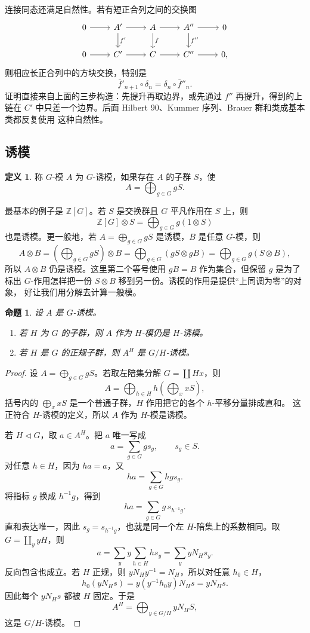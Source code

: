 \documentclass[11pt,a4paper,openany]{ctexbook}
\numberwithin{equation}{chapter}
\newcommand{\Z}{\mathbb{Z}}
\theoremstyle{plain}
\newtheorem{proposition}[theorem]{命题}
\theoremstyle{definition}
\newtheorem{definition}[theorem]{定义}
\theoremstyle{remark}
\begin{document}
连接同态还满足自然性。若有短正合列之间的交换图
\[
\begin{tikzcd}
0 \arrow[r] & A' \arrow[r] \arrow[d,"f'"] & A \arrow[r] \arrow[d,"f"] &
A'' \arrow[r] \arrow[d,"f''"] & 0\\
0 \arrow[r] & C' \arrow[r] & C \arrow[r] & C'' \arrow[r] & 0,
\end{tikzcd}
\]
则相应长正合列中的方块交换，特别是
\[
\bar f'_{n+1}\circ\delta_n=\delta_n\circ \bar f''_n.
\]
证明直接来自上面的三步构造：先提升再取边界，或先通过 $f''$ 再提升，得到的上链在
$C'$ 中只差一个边界。后面 Hilbert 90、Kummer 序列、Brauer 群和类成基本类都反复使用
这种自然性。

\subsection{诱模}

\begin{definition}
称 $G$-模 $A$ 为 $G$-诱模，如果存在 $A$ 的子群 $S$，使
\[
 A=\bigoplus_{g\in G}gS.
\]
\end{definition}

最基本的例子是 $\Z[G]$。若 $S$ 是交换群且 $G$ 平凡作用在 $S$ 上，则
\[
 \Z[G]\otimes S=\bigoplus_{g\in G}g(1\otimes S)
\]
也是诱模。更一般地，若 $A=\bigoplus_{g\in G}gS$ 是诱模，$B$ 是任意 $G$-模，则
\[
A\otimes B
=\left(\bigoplus_{g\in G}gS\right)\otimes B
=\bigoplus_{g\in G}(gS\otimes gB)
=\bigoplus_{g\in G}g(S\otimes B),
\]
所以 $A\otimes B$ 仍是诱模。这里第二个等号使用 $gB=B$ 作为集合，但保留 $g$ 是为了
标出 $G$-作用怎样把一份 $S\otimes B$ 移到另一份。诱模的作用是提供“上同调为零”的对象，
好让我们用分解去计算一般模。

\begin{proposition}
设 $A$ 是 $G$-诱模。
\begin{enumerate}[label=(\arabic*)]
\item 若 $H$ 为 $G$ 的子群，则 $A$ 作为 $H$-模仍是 $H$-诱模。
\item 若 $H$ 是 $G$ 的正规子群，则 $A^H$ 是 $G/H$-诱模。
\end{enumerate}
\end{proposition}

\begin{proof}
设 $A=\bigoplus_{g\in G}gS$。若取左陪集分解 $G=\coprod Hx$，则
\[
 A=\bigoplus_{h\in H}h\left(\bigoplus_xxS\right),
\]
括号内的 $\bigoplus_xxS$ 是一个普通子群，$H$ 作用把它的各个 $h$-平移分量排成直和。
这正符合 $H$-诱模的定义，所以 $A$ 作为 $H$-模是诱模。

若 $H\triangleleft G$，取 $a\in A^H$。把 $a$ 唯一写成
\[
a=\sum_{g\in G}gs_g,\qquad s_g\in S.
\]
对任意 $h\in H$，因为 $ha=a$，又
\[
ha=\sum_{g\in G}hgs_g.
\]
将指标 $g$ 换成 $h^{-1}g$，得到
\[
ha=\sum_{g\in G}g\,s_{h^{-1}g}.
\]
直和表达唯一，因此 $s_g=s_{h^{-1}g}$，也就是同一个左 $H$-陪集上的系数相同。取
$G=\coprod_y yH$，则
\[
 a=\sum_y y\sum_{h\in H}hs_y=\sum_y yN_Hs_y.
\]
反向包含也成立。若 $H$ 正规，则 $yN_Hy^{-1}=N_H$，所以对任意 $h_0\in H$，
\[
h_0(yN_Hs)=y(y^{-1}h_0y)N_Hs=yN_Hs.
\]
因此每个 $yN_Hs$ 都被 $H$ 固定。于是
\[
 A^H=\bigoplus_{y\in G/H}yN_HS,
\]
这是 $G/H$-诱模。
\end{proof}
\end{document}
